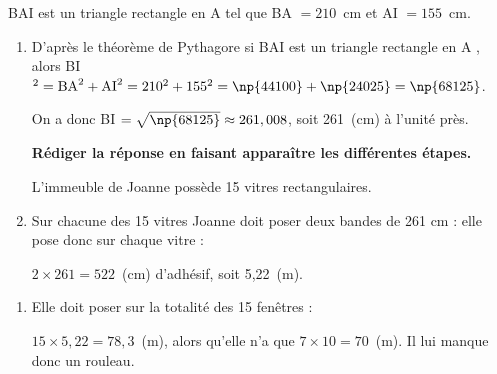 
\medskip

BAI est un triangle rectangle en A tel que BA $= 210$~cm et AI $= 155$~cm. 

\medskip

\begin{enumerate}
\item %
D'après le théorème de Pythagore si BAI est un triangle rectangle en A , alors BI$^2 = \text{BA}^2 + \text{AI}^2 = 210^2 + 155^2 = \np{44100} + \np{24025} = \np{68125}$.

On a donc BI $ = \sqrt{\np{68125}} \approx 261,008$, soit 261~(cm) à l'unité près.

\textbf{Rédiger la réponse en faisant apparaître les différentes étapes.}

L'immeuble de Joanne possède 15 vitres rectangulaires.

%
%
\item %
Sur chacune des 15 vitres Joanne doit poser deux bandes de 261 cm : elle pose donc sur chaque vitre  :

$2 \times 261 = 522$~(cm) d'adhésif, soit 5,22~(m).
\end{enumerate}


\begin{enumerate}[resume]
\item %
Elle doit poser sur la totalité des 15 fenêtres :

$15 \times 5,22 = 78,3$~(m), alors qu'elle n'a que $7 \times 10 = 70$~(m). Il lui manque donc un rouleau.
\end{enumerate}

\bigskip

